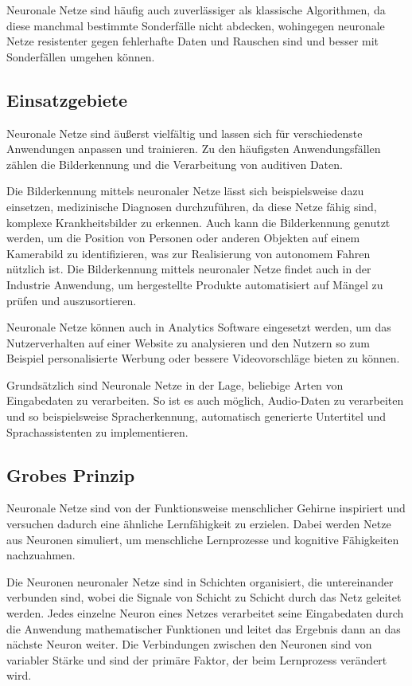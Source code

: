 \bigbreak\noindent
Neuronale Netze sind häufig auch zuverlässiger als klassische Algorithmen, da diese manchmal bestimmte Sonderfälle nicht abdecken, wohingegen neuronale Netze resistenter gegen fehlerhafte Daten und Rauschen sind und besser mit Sonderfällen umgehen können.

\subsection{Einsatzgebiete}\label{subsec:einleitung_nn:einsatzgebiete}
Neuronale Netze sind äußerst vielfältig und lassen sich für verschiedenste Anwendungen anpassen und trainieren.
Zu den häufigsten Anwendungsfällen zählen die Bilderkennung und die Verarbeitung von auditiven Daten.

\bigbreak\noindent
Die Bilderkennung mittels neuronaler Netze lässt sich beispielsweise dazu einsetzen, medizinische Diagnosen durchzuführen, da diese Netze fähig sind, komplexe Krankheitsbilder zu erkennen.
Auch kann die Bilderkennung genutzt werden, um die Position von Personen oder anderen Objekten auf einem Kamerabild zu identifizieren, was zur Realisierung von autonomem Fahren nützlich ist.
Die Bilderkennung mittels neuronaler Netze findet auch in der Industrie Anwendung, um hergestellte Produkte automatisiert auf Mängel zu prüfen und auszusortieren.

\bigbreak\noindent
Neuronale Netze können auch in Analytics Software eingesetzt werden, um das Nutzerverhalten auf einer Website zu analysieren und den Nutzern so zum Beispiel personalisierte Werbung oder bessere Videovorschläge bieten zu können.

\bigbreak\noindent
Grundsätzlich sind Neuronale Netze in der Lage, beliebige Arten von Eingabedaten zu verarbeiten.
So ist es auch möglich, Audio-Daten zu verarbeiten und so beispielsweise Spracherkennung, automatisch generierte Untertitel und Sprachassistenten zu implementieren.

\subsection{Grobes Prinzip}\label{subsec:einleitung_nn_grobes:prinzip}
Neuronale Netze sind von der Funktionsweise menschlicher Gehirne inspiriert und versuchen dadurch eine ähnliche Lernfähigkeit zu erzielen.
Dabei werden Netze aus Neuronen simuliert, um menschliche Lernprozesse und kognitive Fähigkeiten nachzuahmen. 

\bigbreak\noindent
Die Neuronen neuronaler Netze sind in Schichten organisiert, die untereinander verbunden sind, wobei die Signale von Schicht zu Schicht durch das Netz geleitet werden.
Jedes einzelne Neuron eines Netzes verarbeitet seine Eingabedaten durch die Anwendung mathematischer Funktionen und leitet das Ergebnis dann an das nächste Neuron weiter.
Die Verbindungen zwischen den Neuronen sind von variabler Stärke und sind der primäre Faktor, der beim Lernprozess verändert wird.

